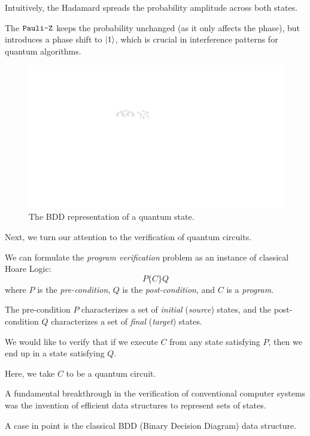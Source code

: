 Intuitively, the Hadamard spreads the probability amplitude across both states.

The $\texttt{Pauli-Z}$ keeps the probability unchanged (as it only affects the phase), but introduces a phase shift to $|1\rangle$, which is crucial in interference patterns for quantum algorithms.


\begin{figure}[ht] 
    \centering
    \includegraphics[scale=1.2]{Figures/BDDs/BDDs} 
    \caption{The BDD representation of a quantum state.}
    \label{BDD:fig}
\end{figure}



Next, we turn our attention to the verification of quantum circuits.

We can formulate the {\it program verification} problem as an instance of classical Hoare Logic:
\[
P \{C\} Q
\]
where $P$ is the {\it pre-condition}, $Q$ is the {\it post-condition}, and $C$ is a {\it program}.

The pre-condition $P$ characterizes a set of {\it initial} ({\it source}) states, and the post-condition $Q$ characterizes a set of {\it final} ({\it target}) states.

We would like to verify that if we execute $C$ from any state satisfying $P$, then we end up in a state satisfying $Q$.

Here, we take $C$ to be a quantum circuit.

A fundamental breakthrough in the verification of conventional computer systems was the invention of efficient data structures to represent sets of states.


A case in point is the classical BDD (Binary Decision Diagram) data structure.

